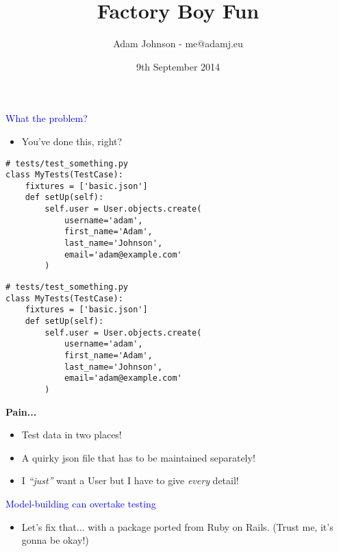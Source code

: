 \documentclass[landscape]{slides}
\title{Factory Boy Fun}
\author{Adam Johnson - me@adamj.eu}
\date{9th September 2014}
\begin{document}
\maketitle

\begin{slide}

    \textcolor{blue}{\Large{What the problem?}}

    \begin{itemize}
        \item You've done this, right?
    \end{itemize}

    \begin{lstlisting}
# tests/test_something.py
class MyTests(TestCase):
    fixtures = ['basic.json']
    def setUp(self):
        self.user = User.objects.create(
            username='adam',
            first_name='Adam',
            last_name='Johnson',
            email='adam@example.com'
        )
    \end{lstlisting}

\end{slide}


\begin{slide}
    \begin{lstlisting}
# tests/test_something.py
class MyTests(TestCase):
    fixtures = ['basic.json']
    def setUp(self):
        self.user = User.objects.create(
            username='adam',
            first_name='Adam',
            last_name='Johnson',
            email='adam@example.com'
        )
    \end{lstlisting}

    \textbf{Pain...}

    \begin{itemize}
        \item Test data in two places!
        \item A quirky json file that has to be maintained separately!
        \item I \emph{“just”} want a User but I have to give \emph{every} detail!
    \end{itemize}
\end{slide}


\begin{slide}
    \textcolor{blue}{\Large{Model-building can overtake testing}}

    \begin{itemize}
        \item Let's fix that... with a package ported from Ruby on Rails. (Trust me, it's gonna be okay!)
    \end{itemize}
\end{slide}
\end{document}
